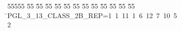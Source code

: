 %
%
\begin{tabbing}
55555 \= 55 \= 55 \= 55 \= 55 \= 55 \= 55 \= 55 \= 55 \= 55 \= 55 \= 55 \= 55 \= \>PGL\_3\_13\_CLASS\_2B\_REP=1\ 1\ 11\ 1\ 6\ 12\ 7\ 10\ 5\\[0pt]
2\>\end{tabbing}
